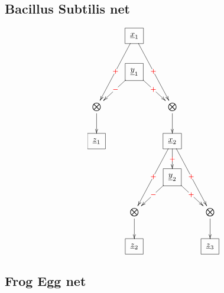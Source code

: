 \subsection{Bacillus Subtilis net}

\begin{figure}[h!]
$$
\xymatrix{
&\Rect{\rvx_1}\ar[ddl]|\redplus
\ar[ddr]|\redplus
\\
&\Rect{\rvy_1}
\ar[dl]|\redminus
\ar[dr]|\redplus
\\
\bigotimes\ar[d]
&&\bigotimes\ar[d]
\\
\Rect{\rvz_1}
&&\Rect{\rvx_2}
\ar[d]|\redplus
\ar[ddl]|\redplus
\ar[ddr]|\redplus
\\
&&\Rect{\rvy_2}\ar[dl]|\redminus
\ar[dr]|\redplus
\\
&\bigotimes\ar[d]
&&\bigotimes\ar[d]
\\
&\Rect{\rvz_2}
&&\Rect{\rvz_3}
}$$
\end{figure}






\subsection{Frog Egg net}

